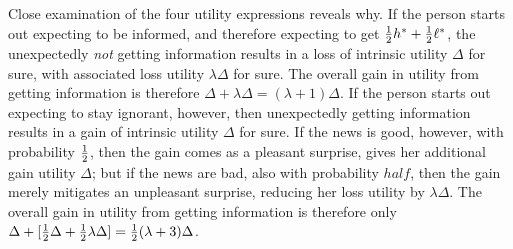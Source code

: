 Close examination of the four utility expressions reveals why. If the person starts out expecting to be informed, and therefore expecting to get $\tfrac{1}{2} h^* + \tfrac{1}{2} \ell^*$, the unexpectedly \emph{not} getting information results in a loss of intrinsic utility $\Delta$ for sure, with associated loss utility $\lambda \Delta$ for sure. The overall gain in utility from getting information is therefore $\Delta + \lambda \Delta = (\lambda+1)\Delta$. If the person starts out expecting to stay ignorant, however, then unexpectedly getting information results in a gain of intrinsic utility $\Delta$ for sure. If the news is good, however, with probability $\tfrac{1}{2}$, then the gain comes as a pleasant surprise, gives her additional gain utility $\Delta$; but if the news are bad, also with probability $half$, then the gain merely mitigates an unpleasant surprise, reducing her loss utility by $\lambda \Delta$. The overall gain in utility from getting information is therefore only $\Delta + [\tfrac{1}{2} \Delta + \tfrac{1}{2} \lambda \Delta]=\tfrac{1}{2}(\lambda+3)\Delta$.
